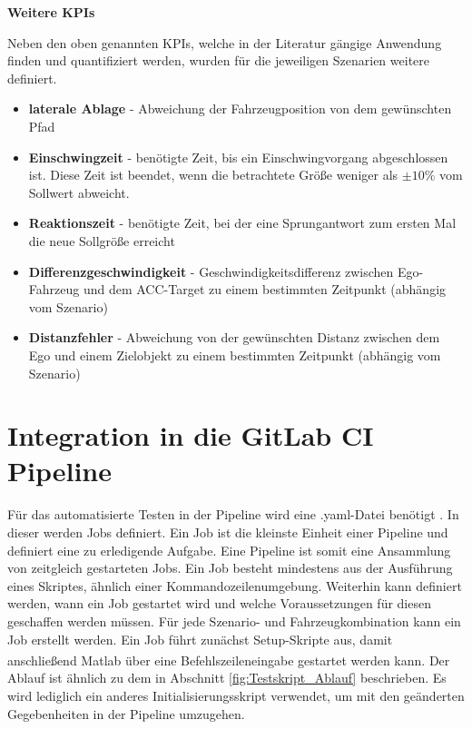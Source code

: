 \bigskip\noindent\textbf{Weitere KPIs}

\noindent Neben den oben genannten KPIs, welche in der Literatur gängige Anwendung finden und quantifiziert werden, wurden für die jeweiligen Szenarien weitere definiert.

\begin{itemize}
    \item \textbf{laterale Ablage} - Abweichung der Fahrzeugposition von dem gewünschten Pfad
    \item \textbf{Einschwingzeit} - benötigte Zeit, bis ein Einschwingvorgang abgeschlossen ist. Diese Zeit ist beendet, wenn die betrachtete Größe weniger als $\pm 10 \%$ vom Sollwert abweicht. 
    \item \textbf{Reaktionszeit} - benötigte Zeit, bei der eine Sprungantwort zum ersten Mal die neue Sollgröße erreicht 
    \item \textbf{Differenzgeschwindigkeit} - Geschwindigkeitsdifferenz zwischen Ego-Fahrzeug und dem ACC-Target zu einem bestimmten Zeitpunkt (abhängig vom Szenario)
    \item \textbf{Distanzfehler} - Abweichung von der gewünschten Distanz zwischen dem Ego und einem Zielobjekt zu einem bestimmten Zeitpunkt (abhängig vom Szenario)
\end{itemize}

\section{Integration in die GitLab CI Pipeline} \label{sec:CIPipeline}
Für das automatisierte Testen in der Pipeline wird eine .yaml-Datei benötigt \cite{GitLabDoks}. In dieser werden Jobs definiert. Ein Job ist die kleinste Einheit einer Pipeline und definiert eine zu erledigende Aufgabe. Eine Pipeline ist somit eine Ansammlung von zeitgleich gestarteten Jobs. Ein Job besteht mindestens aus der Ausführung eines Skriptes, ähnlich einer Kommandozeilenumgebung. Weiterhin kann definiert werden, wann ein Job gestartet wird und welche Voraussetzungen für diesen geschaffen werden müssen. Für jede Szenario- und Fahrzeugkombination kann ein Job erstellt werden. Ein Job führt zunächst Setup-Skripte aus, damit anschließend Matlab\textsuperscript{\textregistered} über eine Befehlszeileneingabe gestartet werden kann. Der Ablauf ist ähnlich zu dem in Abschnitt \ref{fig:Testskript_Ablauf} beschrieben. Es wird lediglich ein anderes Initialisierungsskript verwendet, um mit den geänderten Gegebenheiten in der Pipeline umzugehen.

